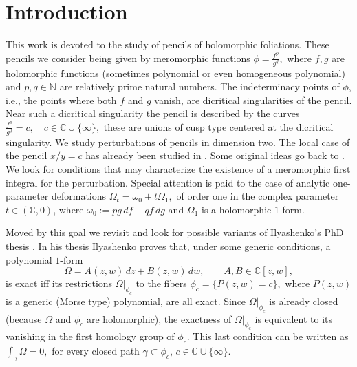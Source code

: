 \documentclass[11pt,a4paper]{amsart}
\theoremstyle{definition}
\begin{document}
\section{Introduction}
\label{section:intro}
This work is devoted to the study of pencils of holomorphic foliations. These
pencils we consider being given by meromorphic functions
$
\phi=\frac{f^p}{g^q},
$
where $f,g$ are holomorphic functions (sometimes polynomial or even homogeneous
polynomial) and $p,q\in\mathbb{N}$ are relatively prime natural numbers.
The indeterminacy points of $\phi$, i.e., the points where both $f$ and $g$
vanish, are dicritical singularities of the pencil. Near such a dicritical
singularity the pencil is described by the curves
$
\frac{f^p}{g^q}=c, \quad c\in\mathbb{C}\cup\{\infty\},
$
these are unions of cusp type centered at the dicritical singularity.
We study perturbations of pencils in dimension two.  The local case of the pencil $x/y=c$ has already been studied in \cite{ScarduaIJM}. Some  original ideas go back to \cite{Mucino}. We look for conditions that
may characterize the existence of a meromorphic first integral for the
perturbation. Special attention is paid to the case of analytic one-parameter
deformations
$\Omega_t=\omega_0+t\Omega_1,$
of order one in the complex parameter $t\in(\mathbb{C},0)$, where
$
\omega_0:=pg\,df-qf\,dg
$
and $\Omega_1$ is a holomorphic $1$-form.

Moved by this goal we revisit and look for possible variants of Ilyashenko's
PhD thesis \cite{Ilyashenko}. In his thesis Ilyashenko proves that, under some
generic conditions, a polynomial $1$-form
\[
\Omega=A(z,w)\,dz+B(z,w)\,dw, \qquad A,B\in\mathbb{C}[z,w],
\]
is exact iff its restrictions $\Omega|_{\phi_c}$ to the fibers
$
\phi_c=\{P(z,w)=c\},
$
where $P(z,w)$ is a generic (Morse type) polynomial, are all exact. Since
$\Omega|_{\phi_c}$ is already closed (because $\Omega$ and $\phi_c$ are holomorphic),
the exactness of $\Omega|_{\phi_c}$ is equivalent to its vanishing in the first
homology group of $\phi_c$. 
This last condition can be written as
$
\int_\gamma \Omega = 0,
$
for every closed path $\gamma\subset\phi_c$, $c\in\mathbb{C}\cup\{\infty\}$.
\end{document}
